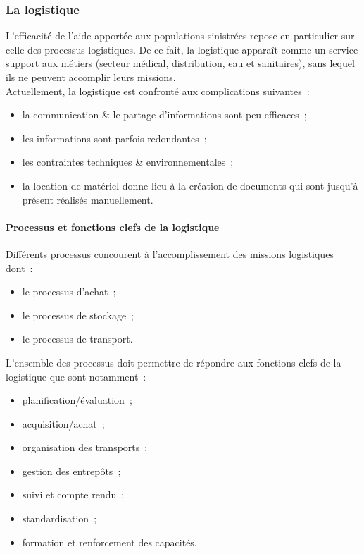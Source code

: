 \subsubsection{La logistique}
L'efficacité de l'aide apportée aux populations sinistrées repose en particulier sur celle des processus logistiques. De ce fait, la logistique apparaît comme un service support aux métiers (secteur médical, distribution, eau et sanitaires), sans lequel ils ne peuvent accomplir leurs missions.
\\
Actuellement, la logistique est confronté aux complications suivantes~:
\begin{itemize}
	\item la communication \& le partage d'informations sont peu efficaces~;
	\item les informations sont parfois redondantes~;
	\item les contraintes techniques \& environnementales~;
	\item la location de matériel donne lieu à la création de documents qui sont jusqu'à présent réalisés manuellement.
\end{itemize}

\paragraph{Processus et fonctions clefs de la logistique}
Différents processus concourent à l'accomplissement des missions logistiques dont~:
\begin{itemize}
	\item le processus d'achat~;
	\item le processus de stockage~;
	\item le processus de transport.
\end{itemize}
L'ensemble des processus doit permettre de répondre aux fonctions clefs de la logistique que sont notamment~:
\begin{itemize}
	\item planification/évaluation~;
	\item acquisition/achat~;
	\item organisation des transports~;
	\item gestion des entrepôts~;
	\item suivi et compte rendu~;
	\item standardisation~;
	\item formation et renforcement des capacités.
\end{itemize}

